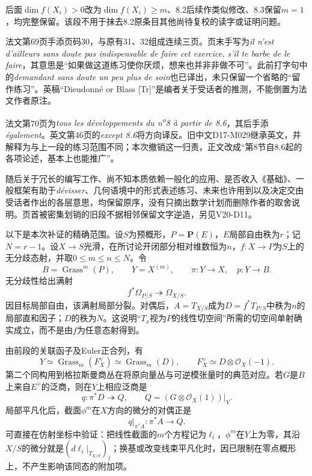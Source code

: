 后面$\dim f(X_i)>0$改为$\dim f(X_i)\geq m$、8.2后续作类似修改、8.3保留$m=1$，均完整保留。该段不用于抹去8.2原条目其他尚待复校的读字或证明问题。

法文第69页手添页码30，与原有31、32组成连续三页。页末手写为\emph{il n'est d'ailleurs sans doute pas indispensable de faire cet exercice, s'il te barbe de le faire}，其意思是“如果做这道练习使你厌烦，想来也并非非做不可”。此前打字句中的\emph{demandant sans doute un peu plus de soin}也已译出，未只保留一个省略的“留作练习”。英稿“Dieudonné or Blass [Tr]”是编者关于受话者的推测，不能倒置为法文作者原注。

法文第70页为\emph{tous les développements du n\textsuperscript{o}8 à partir de 8.6}，其后手添\emph{également}。英文第46页的\emph{except 8.6}将方向译反。旧中文D17-M029继承英文，并解释为与上一段的练习范围不同；本次撤销这一归责，正文改成“第8节自8.6起的各项论述，基本上也能推广”。

随后关于冗长的编写工作、尚不知本质依赖一般化的应用、是否收入《基础》、一般框架有助于\emph{dévisser}、几何语境中的形式表述练习、未来也许用到以及决定交由受话者作出的各层意思，均保留原序，没有只摘出数学计划而删除作者的取舍说明。页首被密集划销的旧段不据相邻保留文字逆造，另见V20-D11。

以下是本次补证的精确范围。设$S$为预概形，$P=\mathbf P(E)$，$E$局部自由秩为$r$；记$N=r-1$。设$X\to S$光滑，在所讨论开闭部分相对维数恒为$n$，$f\colon X\to P$为$S$上的无分歧态射，并取$0\leq m\leq n\leq N$。令
\[
B=\operatorname{Grass}^{m}(P),\qquad
Y=X^{(m)},\qquad
\pi\colon Y\to X,\quad p\colon Y\to B.
\]
无分歧性给出满射
\[
f^*\Omega_{P/S}\twoheadrightarrow\Omega_{X/S}.
\]
因目标局部自由，该满射局部分裂。对偶后，$A=T_{X/S}$成为$D=f^*T_{P/S}$中秩为$n$的局部直和因子；$D$的秩为$N$。这说明“$T_x$视为$P$的线性切空间”所需的切空间单射确实成立，而不是由$f$为任意态射得到。

由前段的关联函子及Euler正合列，有
\[
Y\simeq\operatorname{Grass}_{m}(F_X^\vee)
\simeq\operatorname{Grass}_{m}(D),
\qquad F_X^\vee\simeq D\otimes\mathcal O_X(-1).
\]
第二个同构用到格拉斯曼商丛在将原向量丛与可逆模张量时的典范对应。若$G$是$B$上来自$E^\vee$的泛商，则在$Y$上相应泛商是
\[
q\colon\pi^*D\twoheadrightarrow Q,
\qquad Q=(G\otimes\mathcal O_X(1))|_Y.
\]
局部平凡化后，截面$\phi^m$在$X$方向的微分的对偶正是
\[
q|_{\pi^*A}\colon\pi^*A\longrightarrow Q.
\]
可直接在仿射坐标中验证：把线性截面的$m$个方程记为$\ell_i$，$\phi^m$在$Y$上为零，其沿$X/S$的微分就是$(d\ell_i|_{T_{X/S}})_i$；换基或改变线束平凡化时，因已限制在零点概形上，不产生影响该同态的附加项。

